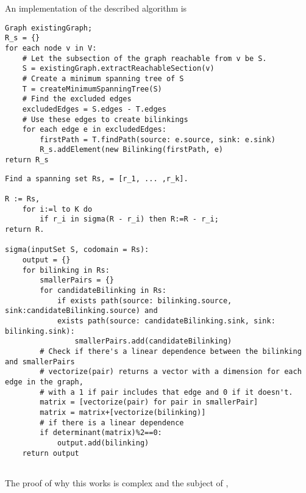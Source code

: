 \documentclass{article}
\begin{document}


An implementation of the described algorithm is

\begin{verbatim}
Graph existingGraph;
R_s = {}
for each node v in V:
    # Let the subsection of the graph reachable from v be S.
    S = existingGraph.extractReachableSection(v)
    # Create a minimum spanning tree of S
    T = createMinimumSpanningTree(S)
    # Find the excluded edges
    excludedEdges = S.edges - T.edges
    # Use these edges to create bilinkings
    for each edge e in excludedEdges:
        firstPath = T.findPath(source: e.source, sink: e.sink)
        R_s.addElement(new Bilinking(firstPath, e)
return R_s
\end{verbatim}

\begin{verbatim}
Find a spanning set Rs, = [r_1, ... ,r_k].

R := Rs,
    for i:=l to K do
        if r_i in sigma(R - r_i) then R:=R - r_i;
return R.

sigma(inputSet S, codomain = Rs):
    output = {}
    for bilinking in Rs:
        smallerPairs = {}
        for candidateBilinking in Rs:
            if exists path(source: bilinking.source, sink:candidateBilinking.source) and
            exists path(source: candidateBilinking.sink, sink: bilinking.sink):
                smallerPairs.add(candidateBilinking)
        # Check if there's a linear dependence between the bilinking and smallerPairs
        # vectorize(pair) returns a vector with a dimension for each edge in the graph,
        # with a 1 if pair includes that edge and 0 if it doesn't.
        matrix = [vectorize(pair) for pair in smallerPair]
        matrix = matrix+[vectorize(bilinking)]
        # if there is a linear dependence
        if determinant(matrix)%2==0:
            output.add(bilinking)
    return output
                
\end{verbatim}

The proof of why this works is complex and the subject of \cite{commutative}, 
\end{document}

